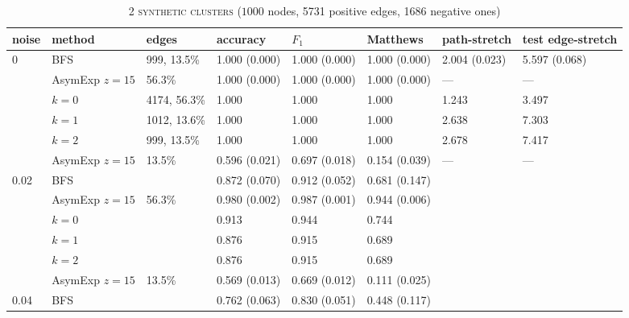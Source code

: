 \documentclass[a4paper,final,notitlepage,11pt,svgnames]{scrartcl}
\begin{document}
\begin{table}[htpb]
	\centering
	\vspace*{-2em}
	\caption{\textsc{2 synthetic clusters} ($1000$ nodes, 5731 positive edges, 1686 negative ones) \label{tab:synth}}
	\begin{tabular}{llllllll}
		\toprule
		noise                 & method         & edges        & accuracy      & $F_1$         & Matthews       & path-stretch  & test edge-stretch \\
		\midrule
		\multirow{6}{*}{0}    & BFS            & 999, 13.5\%  & 1.000 (0.000) & 1.000 (0.000) & 1.000 (0.000)  & 2.004 (0.023) & 5.597 (0.068) \\
		                      & AsymExp $z=15$ & 56.3\%       & 1.000 (0.000) & 1.000 (0.000) & 1.000 (0.000)  & ---           & ---\\
		                      & $k=0$          & 4174, 56.3\% & 1.000         & 1.000         & 1.000          & 1.243         & 3.497 \\
		                      & $k=1$          & 1012, 13.6\% & 1.000         & 1.000         & 1.000          & 2.638         & 7.303 \\
		                      & $k=2$          & 999, 13.5\%  & 1.000         & 1.000         & 1.000          & 2.678         & 7.417 \\
		                      & AsymExp $z=15$ & 13.5\%       & 0.596 (0.021) & 0.697 (0.018) & 0.154 (0.039)  & ---           & ---\\
		\midrule
		\multirow{6}{*}{0.02} & BFS            &              & 0.872 (0.070) & 0.912 (0.052) & 0.681 (0.147)  &               & \\
		                      & AsymExp $z=15$ & 56.3\%       & 0.980 (0.002) & 0.987 (0.001) & 0.944 (0.006)  &               &    \\
		                      & $k=0$          &              & 0.913         & 0.944         & 0.744          &               & \\
		                      & $k=1$          &              & 0.876         & 0.915         & 0.689          &               & \\
		                      & $k=2$          &              & 0.876         & 0.915         & 0.689          &               & \\
		                      & AsymExp $z=15$ & 13.5\%       & 0.569 (0.013) & 0.669 (0.012) & 0.111 (0.025)  &               &    \\
		\cmidrule(r){2-6}
		\multirow{6}{*}{0.04} & BFS            &              & 0.762 (0.063) & 0.830 (0.051) & 0.448 (0.117)  &               & \\

\end{tabular}
\end{table}
\end{document}
